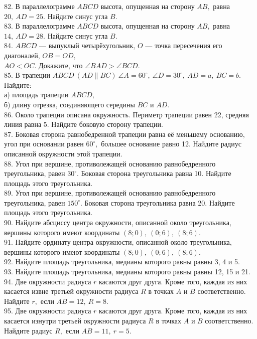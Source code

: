 \documentclass[12pt]{article}
\begin{document}
82. В параллелограмме $ABCD$ высота, опущенная на сторону $AB,$ равна $20,\ AD=25.$ Найдите синус угла $B.$\\
83. В параллелограмме $ABCD$ высота, опущенная на сторону $AB,$ равна $14,\ AD=28.$ Найдите синус угла $B.$\\
84. $ABCD$ --- выпуклый четырёхугольник, $O$ --- точка пересечения его диагоналей, $OB=OD,$\\$AO<OC.$ Докажите, что $\angle BAD>\angle BCD.$\\
85. В трапеции $ABCD\ (AD\parallel BC)\ \angle A=60^\circ,\ \angle D=30^\circ,\ AD=a,\ BC=b.$ Найдите:\\
а) площадь трапеции $ABCD,$\\
б) длину отрезка, соединяющего середины $BC$ и $AD.$\\
86. Около трапеции описана окружность. Периметр трапеции равен 22, средняя линия равна 5. Найдите боковую сторону трапеции.\\
87. Боковая сторона равнобедренной трапеции равна её меньшему основанию, угол при основании равен $60^\circ,$ большее основание равно 12. Найдите радиус описанной окружности этой трапеции.\\
88. Угол при вершине, противолежащей основанию равнобедренного треугольника, равен $30^\circ.$ Боковая сторона треугольника равна 10. Найдите площадь этого треугольника.\\
89. Угол при вершине, противолежащей основанию равнобедренного треугольника, равен $150^\circ.$ Боковая сторона треугольника равна 20. Найдите площадь этого треугольника.\\
90. Найдите абсциссу центра окружности, описанной около треугольника, вершины которого имеют координаты $(8;0),\ (0;6),\ (8;6).$\\
91. Найдите ординату центра окружности, описанной около треугольника, вершины которого имеют координаты $(8;0),\ (0;6),\ (8;6).$\\
92. Найдите площадь треугольника, медианы которого равны равны 3, 4 и 5.\\
93. Найдите площадь треугольника, медианы которого равны равны 12, 15 и 21.\\
94. Две окружности радиуса $r$ касаются друг друга. Кроме того, каждая из них касается извне третьей окружности радиуса $R$ в точках $A$ и $B$ соответственно. Найдите  $r,$ если $AB=12,\ R=8.$\\
95. Две окружности радиуса $r$ касаются друг друга. Кроме того, каждая из них касается изнутри третьей окружности радиуса $R$ в точках $A$ и $B$ соответственно. Найдите радиус $R,$ если $AB=11,\ r=5.$\\
\end{document}
